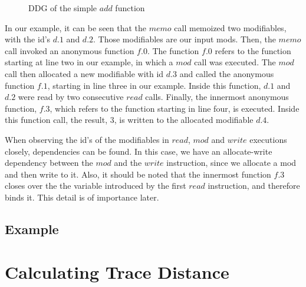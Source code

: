 \begin{figure}
\centering
{}
\caption{DDG of the simple $add$ function}
\label{fig:add_ddg}
\end{figure}

In our example, it can be seen that the $memo$ call memoized two modifiables, with the id's $d.1$ and $d.2$. Those modifiables are our input mods. Then, the $memo$ call invoked an anonymous function $f.0$. The function $f.0$ refers to the function starting at line two in our example, in which a $mod$ call was executed. The $mod$ call then allocated a new modifiable with id $d.3$ and called the anonymous function $f.1$, starting in line three in our example. Inside this function, $d.1$ and $d.2$ were read by two consecutive $read$ calls. Finally, the innermost anonymous function, $f.3$, which refers to the function starting in line four, is executed. Inside this function call, the result, $3$, is written to the allocated modifiable $d.4$. 

When observing the id's of the modifiables in $read$, $mod$ and $write$ executions closely, dependencies can be found. In this case, we have an allocate-write dependency between the $mod$ and the $write$ instruction, since we allocate a mod and then write to it. Also, it should be noted that the innermost function $f.3$ closes over the the variable introduced by the first $read$ instruction, and therefore binds it. This detail is of importance later. 


\section{Example}




\chapter{Calculating Trace Distance}
\label{ch:implementation}

